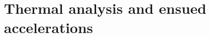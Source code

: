 %
%
%


\section{Thermal analysis and ensued accelerations}
\label{sec:Intro_Thermal}

{\small\textit{\lipsum[1-2]}}



